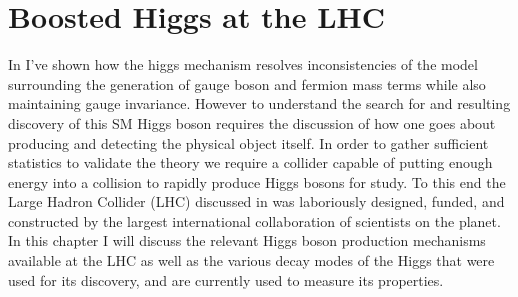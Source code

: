 \chapter{Boosted Higgs at the LHC} \label{chap:higgs}

In  I've shown how the higgs mechanism resolves
inconsistencies of the model surrounding the generation of gauge boson and
fermion mass terms while also maintaining gauge invariance.  However to
understand the search for and resulting discovery of this SM Higgs boson
requires the discussion of how one goes about producing and detecting the
physical object itself.  In order to gather sufficient statistics to validate
the theory we require a collider capable of putting enough energy into a
collision to rapidly produce Higgs bosons for study.  To this end the Large
Hadron Collider (LHC) discussed in  was laboriously
designed, funded, and constructed by the largest international collaboration of
scientists on the planet. In this chapter I will discuss the relevant Higgs
boson production mechanisms available at the LHC as well as the various decay
modes of the Higgs that were used for its discovery, and are currently used to
measure its properties.






